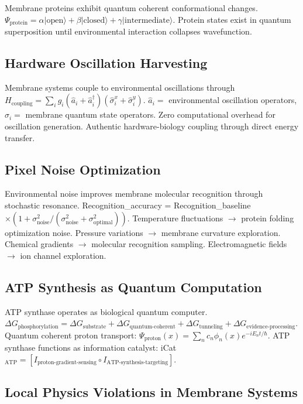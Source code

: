 \documentclass[12pt,a4paper]{article}
\begin{document}
Membrane proteins exhibit quantum coherent conformational changes. $\Psi_{\text{protein}} = \alpha|\text{open}\rangle + \beta|\text{closed}\rangle + \gamma|\text{intermediate}\rangle$. Protein states exist in quantum superposition until environmental interaction collapses wavefunction.

\subsection{Hardware Oscillation Harvesting}

Membrane systems couple to environmental oscillations through $H_{\text{coupling}} = \sum_i g_i (\hat{a}_i + \hat{a}_i^\dagger)(\hat{\sigma}_i^x + \hat{\sigma}_i^y)$. $\hat{a}_i =$ environmental oscillation operators, $\hat{\sigma}_i =$ membrane quantum state operators. Zero computational overhead for oscillation generation. Authentic hardware-biology coupling through direct energy transfer.

\subsection{Pixel Noise Optimization}

Environmental noise improves membrane molecular recognition through stochastic resonance. Recognition_accuracy = Recognition_baseline $\times (1 + \sigma_{\text{noise}}^2/(\sigma_{\text{noise}}^2 + \sigma_{\text{optimal}}^2))$. Temperature fluctuations $\to$ protein folding optimization noise. Pressure variations $\to$ membrane curvature exploration. Chemical gradients $\to$ molecular recognition sampling. Electromagnetic fields $\to$ ion channel exploration.

\subsection{ATP Synthesis as Quantum Computation}

ATP synthase operates as biological quantum computer. $\Delta G_{\text{phosphorylation}} = \Delta G_{\text{substrate}} + \Delta G_{\text{quantum-coherent}} + \Delta G_{\text{tunneling}} + \Delta G_{\text{evidence-processing}}$. Quantum coherent proton transport: $\Psi_{\text{proton}}(x) = \sum_n c_n \phi_n(x) e^{-iE_n t/\hbar}$. ATP synthase functions as information catalyst: iCat$_{\text{ATP}} = [I_{\text{proton-gradient-sensing}} \circ I_{\text{ATP-synthesis-targeting}}]$.

\subsection{Local Physics Violations in Membrane Systems}
\end{document}
